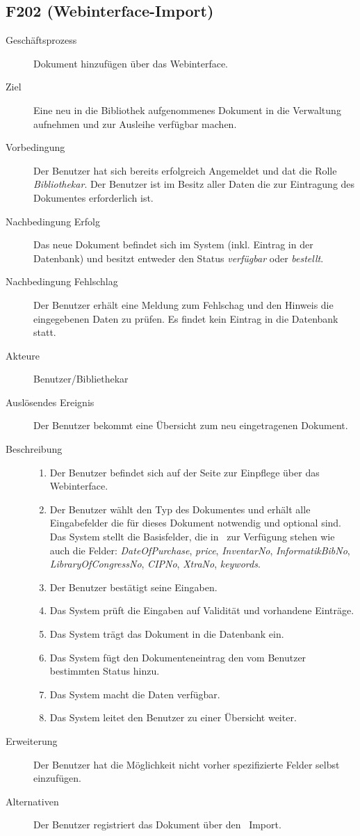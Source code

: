 \subsection{F202 (Webinterface-Import)}
\label{F:Web-Import}
\begin{description}
  \item[Geschäftsprozess]Dokument hinzufügen über das Webinterface.
  \item[Ziel]Eine neu in die Bibliothek aufgenommenes Dokument in die Verwaltung aufnehmen und zur Ausleihe verfügbar machen.
  \item[Vorbedingung]Der Benutzer hat sich bereits erfolgreich Angemeldet und dat die Rolle \emph{Bibliothekar}. Der Benutzer ist im Besitz aller Daten die zur Eintragung des Dokumentes erforderlich ist.
  \item[Nachbedingung Erfolg]Das neue Dokument befindet sich im System (inkl. Eintrag in der Datenbank) und besitzt entweder den Status \emph{verfügbar} oder \emph{bestellt}.
  \item[Nachbedingung Fehlschlag]Der Benutzer erhält eine Meldung zum Fehlschag und den Hinweis die eingegebenen Daten zu prüfen. Es findet kein Eintrag in die Datenbank statt.
  \item[Akteure]Benutzer/Bibliethekar
  \item[Auslösendes Ereignis]Der Benutzer bekommt eine Übersicht zum neu eingetragenen Dokument.
  \item[Beschreibung]
    \begin{enumerate}
      \item Der Benutzer befindet sich auf der Seite zur Einpflege über das Webinterface.
      \item Der Benutzer wählt den Typ des Dokumentes und erhält alle Eingabefelder die für dieses Dokument notwendig und optional sind. Das System stellt die Basisfelder, die in \BibTeX\ zur Verfügung stehen wie auch die Felder: \emph{DateOfPurchase}, \emph{price}, \emph{InventarNo}, \emph{InformatikBibNo}, \emph{LibraryOfCongressNo}, \emph{CIPNo}, \emph{XtraNo}, \emph{keywords}.
      \item Der Benutzer bestätigt seine Eingaben.
      \item Das System prüft die Eingaben auf Validität und vorhandene Einträge.
      \item Das System trägt das Dokument in die Datenbank ein.
      \item Das System fügt den Dokumenteneintrag den vom Benutzer bestimmten Status hinzu.
      \item Das System macht die Daten verfügbar.
      \item Das System leitet den Benutzer zu einer Übersicht weiter.
    \end{enumerate}
  \item[Erweiterung]Der Benutzer hat die Möglichkeit nicht vorher spezifizierte Felder selbst einzufügen.
  \item[Alternativen]Der Benutzer registriert das Dokument über den \BibTeX\ Import.
\end{description}

